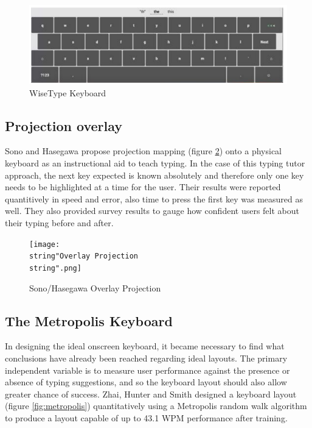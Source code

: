 \documentclass[english]{vgtc}
\begin{document}
\begin{figure}
  \centering
  \includegraphics[width=0.95\columnwidth]{WiseType}
  \caption{WiseType Keyboard \cite{alhabri19}}
  \label{fig:wisetype_keyboard}
\end{figure}

\subsection{Projection overlay}
Sono and Hasegawa \cite{Sono19} propose projection mapping (figure
\ref{fig:overlay}) onto a physical keyboard as an instructional aid to teach typing.
In the case of this typing tutor approach, the next key expected is
known absolutely and therefore only one key needs to be highlighted
at a time for the user. Their results were reported quantitively in
speed and error, also time to press the first key was measured as
well. They also provided survey results to gauge how confident users
felt about their typing before and after. 

\begin{figure}
  \centering
  \texttt{[image: \\string"Overlay Projection\\string".png]}
  \caption{Sono/Hasegawa Overlay Projection \cite{Sono19}}
  \label{fig:overlay}
\end{figure}

\subsection{The Metropolis Keyboard}
In designing the ideal onscreen keyboard, it became necessary to find
what conclusions have already been reached regarding ideal layouts.
The primary independent variable is to measure user performance against
the presence or absence of typing suggestions, and so the keyboard
layout should also allow greater chance of success. Zhai, Hunter and
Smith designed a keyboard layout (figure \ref{fig:metropolis}) quantitatively using a
Metropolis random walk algorithm to produce a layout capable of up to 43.1
WPM performance after training. \cite{Zhai00}
\end{document}
